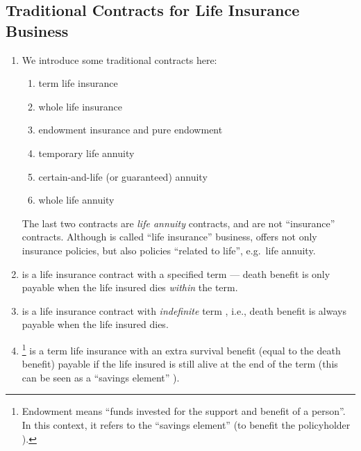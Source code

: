 \subsection{Traditional Contracts for Life Insurance Business}
\label{subsect:traditional-contracts}
\begin{enumerate}
\item We introduce some traditional contracts here:
\begin{enumerate}
\item term life insurance \textbar{}
\item whole life insurance \textbar{}
\item endowment insurance \textbar{}\textbar{} and pure endowment 
\item temporary life annuity \textbar{}
\item certain-and-life (or guaranteed) annuity \textbar{}\textbar{}
\item whole life annuity \textbar{}
\end{enumerate}
\begin{note}
The last two contracts are \emph{life annuity} contracts, and are
not ``insurance'' contracts. Although  is called ``life
insurance'' business,  offers not only insurance policies, but
also policies ``related to life'', e.g.\ life annuity.
\end{note}

\item {} is a life insurance contract
 with a specified term --- death benefit is
only payable when the life insured dies \emph{within} the term.

\item {} is a life insurance contract
 with \emph{indefinite} term , i.e., death
benefit is always payable when the life insured dies.

\item {}\footnote{Endowment means ``funds invested for
the support and benefit of a person''. In this context, it refers to the
``savings element''  (to benefit the policyholder
).} is a term life insurance
\textbar{} with an extra survival benefit
 (equal to the death benefit) payable if the life
insured is still alive at the end of the term (this can be seen as a ``savings
element'' ).


\end{enumerate}
